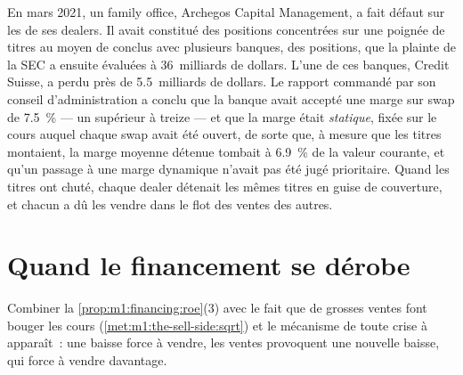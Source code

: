 \begin{example}[Archegos]\label{ex:m1:financing:archegos}
En mars 2021, un family office, Archegos Capital Management, a fait défaut sur
les  de ses dealers. Il avait constitué des positions concentrées sur
une poignée de titres au moyen de  conclus avec plusieurs banques, des positions,
que la plainte de la SEC a ensuite évaluées à 36~milliards de dollars. L'une de ces banques,
Credit Suisse, a perdu près de 5.5~milliards de dollars. Le rapport commandé par son conseil
d'administration a conclu que la banque avait accepté une marge sur swap de 7.5~\% ---
un  supérieur à treize --- et que la marge était \emph{statique}, fixée sur le
cours auquel chaque swap avait été ouvert, de sorte que, à mesure que les titres montaient, la marge moyenne
détenue tombait à 6.9~\% de la valeur courante, et qu'un passage à une marge dynamique
n'avait pas été jugé prioritaire. Quand les titres ont chuté, chaque dealer
détenait les mêmes titres en guise de couverture, et chacun a dû les vendre dans le
flot des ventes des autres.
\end{example}

\section{Quand le financement se dérobe}

Combiner la \cref{prop:m1:financing:roe}(3) avec le fait que de grosses ventes font bouger
les cours (\cref{met:m1:the-sell-side:sqrt}) et le mécanisme de toute
crise à  apparaît~: une baisse force à vendre, les ventes provoquent une nouvelle baisse,
qui force à vendre davantage.

